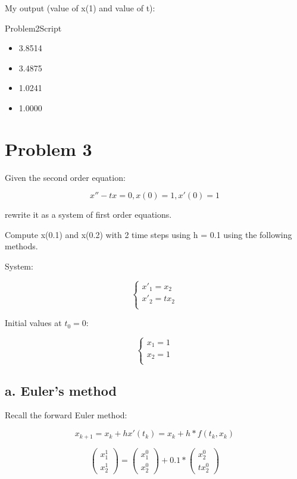 \documentclass[]{article}
\begin{document}
My output (value of x(1) and value of t):

Problem2Script

\begin{itemize}
\item
  3.8514
\item
  3.4875
\item
  1.0241
\item
  1.0000
\end{itemize}

\section{Problem 3}\label{problem-3}

Given the second order equation:

\[x'' -tx = 0, x(0) = 1, x'(0) = 1\]

rewrite it as a system of first order equations.

Compute x(0.1) and x(0.2) with 2 time steps using h = 0.1 using the
following methods.

System:

\[
\begin{cases} 
      x'_1 = x_2 \\
      x'_2 = tx_2 \\ 
\end{cases}
\]

Initial values at \(t_0 = 0\):

\[
\begin{cases} 
      x_1 = 1 \\
      x_2 = 1 \\
\end{cases}
\]

\subsection{a. Euler's method}\label{a.-eulers-method}

Recall the forward Euler method:

\[x_{k+1} = x_k + hx'(t_k) = x_k + h*f(t_k,x_k)\]

\[
\left(\begin{array}{c} 
x_1^1\\
x_2^1
\end{array}\right)=
\left(\begin{array}{c} 
x_1^0 \\
x_2^0 
\end{array}\right) + 0.1 *
\left(\begin{array}{c}
x_2^0 \\
tx_2^0 
\end{array}\right)
\]
\end{document}

